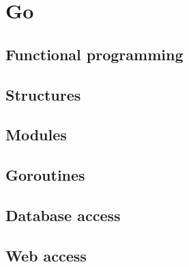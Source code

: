 \section{Go}


\subsection{Functional programming}

\subsection{Structures}

\subsection{Modules}

\subsection{Goroutines}

\subsection{Database access}

\subsection{Web access}